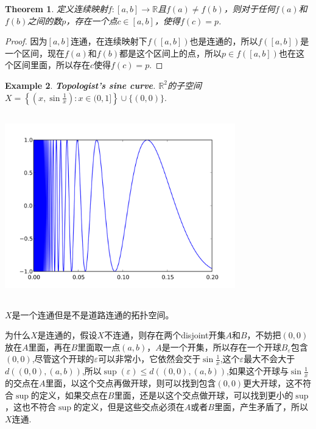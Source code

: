 \documentclass{article}
\newtheorem{theorem}{Theorem}[section]
\newtheorem{example}[theorem]{Example}
\newcommand*{\xfunc}[4]{{#2}\colon{#3}{#1}{#4}}
\newcommand*{\func}[3]{\xfunc{\to}{#1}{#2}{#3}}
\begin{document}
\begin{theorem}
定义连续映射$\func{f}{[a,b]}{\mathbb{R}}$且$f(a) \neq f(b)$，则对于任何$f(a)$和$f(b)$之间的数$p$，存在一个点$c \in [a,b]$，使得$f(c) = p$.
\end{theorem}

\begin{proof}
因为$[a,b]$连通，在连续映射下$f([a,b])$也是连通的，所以$f([a,b])$是一个区间，现在$f(a)$和$f(b)$都是这个区间上的点，所以$p \in f([a,b])$也在这个区间里面，所以存在$c$使得$f(c) = p$.
\end{proof}

\begin{example}
\rm \textbf{Topologist's sine curve}. $\mathbb{R}^2$的子空间$X =  \left\{  \left( x, \sin \tfrac{1}{x}  \right ) :  x \in (0,1] \right\} \cup \{(0,0)\}.$
\begin{center}
\includegraphics[width=10cm, height=8cm]{images/Topologist's_sine_curve.png}
\end{center}
\end{example}

$X$是一个连通但是不是道路连通的拓扑空间。

为什么$X$是连通的，假设$X$不连通，则存在两个disjoint开集$A$和$B$，不妨把$(0,0)$放在$A$里面，再在$B$里面取一点$(a,b)$，$A$是一个开集，所以存在一个开球$B_\varepsilon$包含$(0,0)$,尽管这个开球的$\varepsilon$可以非常小，它依然会交于$\sin\frac{1}{x}$,这个$\varepsilon$最大不会大于$d((0,0),(a,b))$,所以$\sup(\varepsilon) \leq d((0,0),(a,b))$,如果这个开球与$\sin\frac{1}{x}$的交点在$A$里面，以这个交点再做开球，则可以找到包含$(0,0)$更大开球，这不符合$\sup$的定义，如果交点在$B$里面，还是以这个交点做开球，可以找到更小的$\sup$，这也不符合$\sup$的定义，但是这些交点必须在$A$或者$B$里面，产生矛盾了，所以$X$连通.

\end{document}
